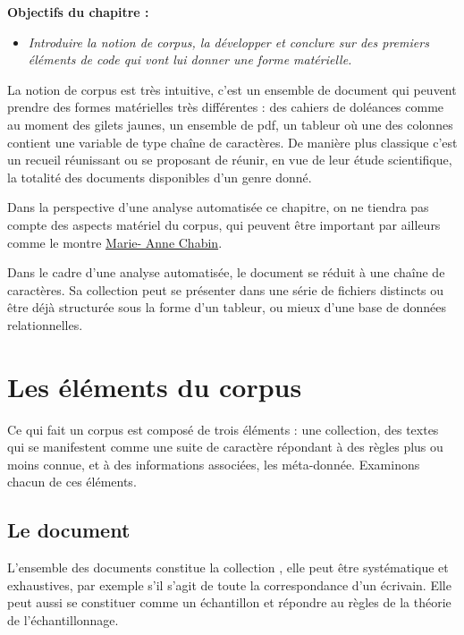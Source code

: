 \documentclass[
  letterpaper,
  DIV=11,
  numbers=noendperiod]{scrreprt}
\begin{document}
\textbf{Objectifs du chapitre :}

\begin{itemize}
\item
  \emph{Introduire la notion de corpus, la développer et conclure sur
  des premiers éléments de code qui vont lui donner une forme
  matérielle.}
\end{itemize}

La notion de corpus est très intuitive, c'est un ensemble de document
qui peuvent prendre des formes matérielles très différentes : des
cahiers de doléances comme au moment des gilets jaunes, un ensemble de
pdf, un tableur où une des colonnes contient une variable de type chaîne
de caractères. De manière plus classique c'est un recueil réunissant ou
se proposant de réunir, en vue de leur étude scientifique, la totalité
des documents disponibles d'un genre donné.

Dans la perspective d'une analyse automatisée ce chapitre, on ne tiendra
pas compte des aspects matériel du corpus, qui peuvent être important
par ailleurs comme le montre
\href{https://www.marieannechabin.fr/2023/07/cahiers-de-doleances-2018-2019-ce-que-la-technologie-et-la-technocratie-nont-pas-vu/}{Marie-
Anne Chabin}.

Dans le cadre d'une analyse automatisée, le document se réduit à une
chaîne de caractères. Sa collection peut se présenter dans une série de
fichiers distincts ou être déjà structurée sous la forme d'un tableur,
ou mieux d'une base de données relationnelles.

\section{Les éléments du corpus}\label{les-uxe9luxe9ments-du-corpus}

Ce qui fait un corpus est composé de trois éléments : une collection,
des textes qui se manifestent comme une suite de caractère répondant à
des règles plus ou moins connue, et à des informations associées, les
méta-donnée. Examinons chacun de ces éléments.

\subsection{Le document}\label{le-document}

L'ensemble des documents constitue la collection , elle peut être
systématique et exhaustives, par exemple s'il s'agit de toute la
correspondance d'un écrivain. Elle peut aussi se constituer comme un
échantillon et répondre au règles de la théorie de l'échantillonnage.
\end{document}
